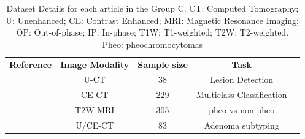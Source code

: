 \documentclass{article}
\begin{document}
\begin{table}[]
    \centering
    \begin{tabular}{ccccc}\toprule
        \multirow{2}{*}{\textbf{Reference}} & \multirow{2}{*}{\textbf{Image Modality}} & \multirow{2}{*}{\textbf{Sample size}} & \multirow{2}{*}{\textbf{Task}} \\
        \\ \midrule
        \cite{Bi2017}                       & U-CT                                     & 38                                    & Lesion Detection               \\
        \cite{Bi2022}                       & CE-CT                                    & 229                                   & Multiclass Classification      \\
        \cite{Kong2022}                     & T2W-MRI                                  & 305                                   & pheo vs non-pheo               \\
        \cite{Zheng2020}                    & U/CE-CT                                  & 83                                    & Adenoma subtyping              \\
        \bottomrule
    \end{tabular}
    \caption{Dataset Details for each article in the Group C. CT: Computed Tomography; U: Unenhanced; CE: Contrast Enhanced; MRI: Magnetic Resonance Imaging; OP: Out-of-phase; IP: In-phase; T1W: T1-weighted; T2W: T2-weighted. Pheo: pheochromocytomas}
    \label{tab:data_C}
\end{table}
\end{document}
